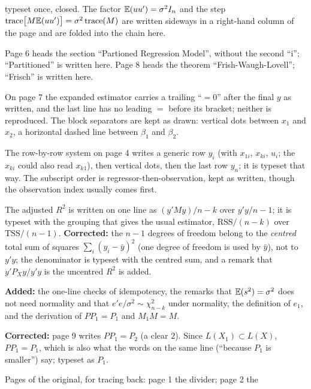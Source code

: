 \documentclass[11pt]{article}
\begin{document}
\begin{transcriptnotes}
        typeset once, closed. The factor $\mathbb{E}(uu')=\sigma^{2}I_{n}$ and the step
        $\operatorname{trace}\bigl[M\mathbb{E}(uu')\bigr] = \sigma^{2}\operatorname{trace}(M)$
        are written sideways in a right-hand column of the page and are folded
        into the chain here.
  \item Page 6 heads the section ``Partioned Regression Model'', without the
        second ``i''; ``Partitioned'' is written here. Page 8 heads the theorem
        ``Frish-Waugh-Lovell''; ``Frisch'' is written here.
  \item On page 7 the expanded estimator carries a trailing ``$=0$'' after the
        final $y$ as written, and the last line has no leading $=$ before its
        bracket; neither is reproduced. The block separators are kept as drawn:
        vertical dots between $x_{1}$ and $x_{2}$, a horizontal dashed line
        between $\beta_{1}$ and $\beta_{2}$.
  \item The row-by-row system on page 4 writes a generic row $y_{i}$ (with
        $x_{1i}$, $x_{ki}$, $u_{i}$; the $x_{ki}$ could also read $x_{k1}$), then
        vertical dots, then the last row $y_{n}$; it is typeset that way. The
        subscript order is regressor-then-observation, kept as written, though
        the observation index usually comes first.
  \item The adjusted $R^{2}$ is written on one line as
        $(y'My)/n-k$ over $y'y/n-1$; it is typeset with the grouping that gives
        the usual estimator, $\text{RSS}/(n-k)$ over $\text{TSS}/(n-1)$.
        \textbf{Corrected:} the $n-1$ degrees of freedom belong to the
        \emph{centred} total sum of squares $\sum_{i}(y_{i}-\bar{y})^{2}$ (one
        degree of freedom is used by $\bar{y}$), not to $y'y$; the denominator is
        typeset with the centred sum, and a remark that $y'P_{X}y/y'y$ is the
        uncentred $R^{2}$ is added.
  \item \textbf{Added:} the one-line checks of idempotency, the remarks that
        $\mathbb{E}(s^{2}) = \sigma^{2}$ does not need normality and that
        $e'e/\sigma^{2}\sim\chi^{2}_{n-k}$ under normality, the definition of
        $e_{1}$, and the derivation of $PP_{1} = P_{1}$ and $M_{1}M = M$.
  \item \textbf{Corrected:} page 9 writes $PP_{1} = P_{2}$ (a clear $2$). Since
        $L(X_{1})\subset L(X)$, $PP_{1} = P_{1}$, which is also what the words on
        the same line (``because $P_{1}$ is smaller'') say; typeset as $P_{1}$.
  \item Pages of the original, for tracing back: page 1 the divider; page 2 the

\end{transcriptnotes}
\end{document}
